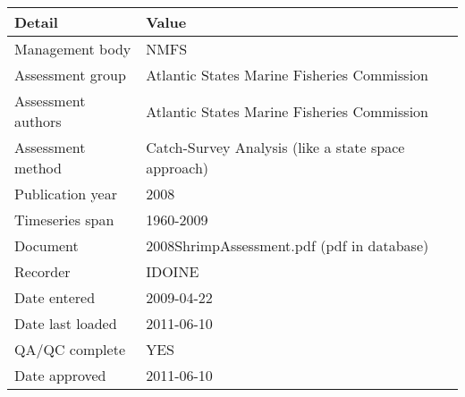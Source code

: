 \begin{table}[htb]
\centering
\begin{tabular}{lp{7cm}}
\toprule
Detail & Value \\
\midrule
Management body    & NMFS                                                \\
Assessment group   & Atlantic States Marine Fisheries Commission         \\
Assessment authors & Atlantic States Marine Fisheries Commission         \\
Assessment method  & Catch-Survey Analysis (like a state space approach) \\
Publication year   & 2008                                                \\
Timeseries span    & 1960-2009                                           \\
Document           & 2008ShrimpAssessment.pdf (pdf in database)          \\
Recorder           & IDOINE                                              \\
Date entered       & 2009-04-22                                          \\
Date last loaded   & 2011-06-10                                          \\
QA/QC complete     & YES                                                 \\
Date approved      & 2011-06-10                                          \\
\bottomrule
\end{tabular}
\label{tab:assessdet}
\end{table}
